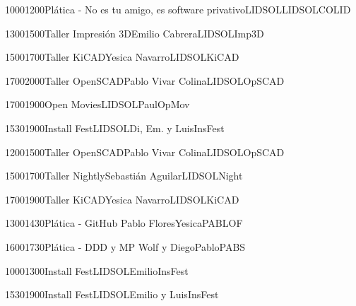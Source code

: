 \documentclass[a4paper,11pt]{article}                 %
\begin{document}
\begin{landscape}
\begin{timetable}

   \daymark{}
  \daymark{}
     \daymark{$ \mapsto$ }
  \daymark{ }
   
  
   
   
   {1000}{1200}{Pl\'{a}tica - No es tu amigo, es software privativo}{LIDSOL}{{\tiny LIDSOL}}{COLID}
  
    {1300}{1500}{Taller Impresi\'{o}n 3D}{Emilio Cabrera}{{\tiny LIDSOL}}{Imp3D}
  
     {1500}{1700}{Taller KiCAD}{Yesica Navarro}{{\tiny LIDSOL}}{KiCAD}
    
     {1700}{2000}{Taller OpenSCAD}{Pablo Vivar Colina}{{\tiny LIDSOL}}{OpSCAD}
    
    
 
  
   {1700}{1900}{Open Movies}{LIDSOL}{{\tiny Paul}}{OpMov}
   
   
    {1530}{1900}{Install Fest}{LIDSOL}{{\tiny Di, Em. y Luis}}{InsFest}
   
  
  
  
   
    {1200}{1500}{Taller OpenSCAD}{Pablo Vivar Colina}{{\tiny LIDSOL}}{OpSCAD}
   
     {1500}{1700}{Taller Nightly}{Sebasti\'{a}n Aguilar}{{\tiny LIDSOL}}{Night}
    
     {1700}{1900}{Taller KiCAD}{Yesica Navarro}{{\tiny LIDSOL}}{KiCAD}
    
    

    
     {1300}{1430}{Pl\'{a}tica - GitHub }{Pablo Flores}{{\tiny Yesica}}{PABLOF}
   
   
    {1600}{1730}{Pl\'{a}tica - DDD y MP }{Wolf y Diego}{{\tiny Pablo}}{PABS}
 
 
  {1000}{1300}{Install Fest}{LIDSOL}{{\tiny Emilio}}{InsFest}
   
    {1530}{1900}{Install Fest}{LIDSOL}{{\tiny Emilio y Luis}}{InsFest}
   
   
   
   
 \end{timetable}
 
 
 \end{landscape}
 
\end{document}
